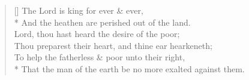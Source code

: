 \documentclass[MAIN]{subfiles}
\begin{document}
\settowidth{\versewidth}{\vin And the heathen are perished out of the land.}
\begin{verse}[\versewidth]
The Lord is king for ever \& ever,\\*
\vin And the heathen are perished out of the land.\\
Lord, thou hast heard the desire of the poor;\\
\vin Thou preparest their heart, and thine ear hearkeneth;\\
To help the fatherless \& poor unto their right,\\*
\vin That the man of the earth be no more exalted against them.
\end{verse}
\end{document}
